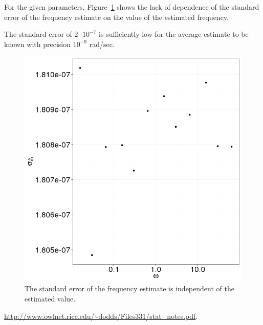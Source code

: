 \documentclass{article}
\begin{document}
For the given parameters, Figure~\ref{fig:SEw_vs_w} shows the lack of dependence of the standard error of the frequency estimate on the value of the estimated frequency.

The standard error of $2\cdot 10^{-7}$ is sufficiently low for the average estimate to be known with precision $10^{-9}$ rad/sec.

\begin{figure}[h]
	\centering
	\includegraphics[scale=.8]{img/StatReq/SEw_vs_w}
	\caption{The standard error of the frequency estimate is independent of the estimated value.\label{fig:SEw_vs_w}}
\end{figure}

\begin{thebibliography}{9}
	\url{http://www.owlnet.rice.edu/~dodds/Files331/stat_notes.pdf}.
\end{thebibliography}
\end{document}
